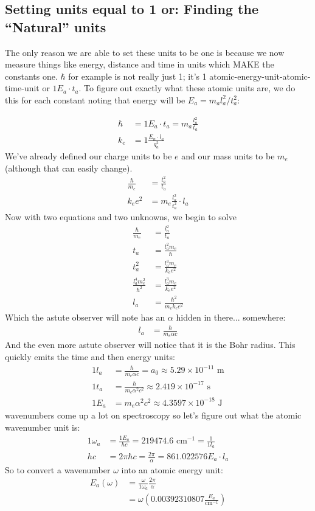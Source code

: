 \subsection{Setting units equal to 1 or: Finding the ``Natural'' units}
The only reason we are able to set these units to be one is because we now measure things like energy, distance and time in units which MAKE the constants one.  $\hbar$ for example is not really just 1; it's 1 atomic-energy-unit-atomic-time-unit or $1 E_a \cdot t_a$.  To figure out exactly what these atomic units are, we do this for each constant noting that energy will be $E_a = m_a l_a^2/t_a^2$:

\begin{align*}
	\hbar &= 1 E_a \cdot t_a = m_a \frac{l_a^2}{t_a}\\
	k_e &= 1 \frac{E_n \cdot l_a}{q_a ^2}
\end{align*}
We've already defined our charge units to be $e$ and our mass units to be $m_e$  (although that can easily change).
\begin{align*}
	\frac{\hbar}{m_e} &= \frac{l_a^2}{t_a}\\
	k_e e^2 &= m_e \frac{l_a^2}{t_a^2} \cdot l_a
\end{align*}
Now with two equations and two unknowns, we begin to solve
\begin{align*}
	\frac{\hbar}{m_e} &= \frac{l_a^2}{t_a}\\
	t_a &= \frac{l_a^2 m_e}{\hbar} \\
	t_a^2 &= \frac{l_a^3 m_e}{k_e e^2} \\
	\frac{l_a^4 m_e^2}{\hbar^2} &= \frac{l_a^3 m_e}{k_e e^2} \\
	l_a &= \frac{\hbar^2}{m_e k_e e^2}
\end{align*}
Which the astute observer will note has an $\alpha$ hidden in there... somewhere:
\begin{align*}
	l_a &= \frac{\hbar}{m_e \alpha c}
\end{align*}
And the even more astute observer will notice that it is the Bohr radius.  This quickly emits the time and then energy units:
\begin{align*}
	1 l_a &= \frac{\hbar}{m_e \alpha c} = a_0 \approx 5.29 \times 10^{-11}\text{ m} \\
	1 t_a &= \frac{\hbar}{m_e \alpha^2 c^2 } \approx 2.419 \times 10^{-17} \text{ s} \\
	1 E_a &= m_e \alpha^2 c^2 \approx 4.3597 \times 10^{-18} \text{ J}
\end{align*}
wavenumbers come up a lot on spectroscopy so let's figure out what the atomic wavenumber unit is:
\begin{align*}
	1 \omega_a &= \frac{1 E_a}{h c} = 219474.6 \text{ cm}^{-1} = \frac{1}{1 l_a} \\
	hc &= 2 \pi \hbar c = \frac{2 \pi}{\alpha} = 861.022576 E_a \cdot l_a
\end{align*}
So to convert a wavenumber $\omega$ into an atomic energy unit:
 \begin{align*}
	E_a (\omega) &= \frac{\omega}{1 \omega_a} \frac{2 \pi}{\alpha} \\
	&= \omega \left( 0.00392310807 \frac{E_a}{\text{cm}^{-1}} \right)
\end{align*}


